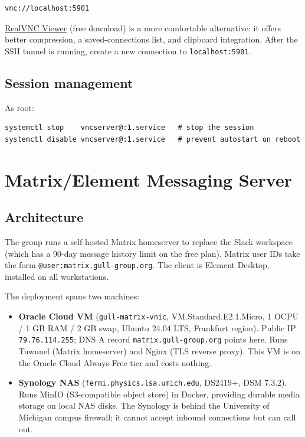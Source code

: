 \documentclass[11pt]{article}
\begin{document}
\begin{verbatim}
vnc://localhost:5901
\end{verbatim}

\href{https://www.realvnc.com/en/connect/download/viewer/}{RealVNC Viewer}
(free download) is a more comfortable alternative: it offers better compression,
a saved-connections list, and clipboard integration.  After the SSH tunnel is
running, create a new connection to \texttt{localhost:5901}.

\subsection*{Session management}

As root:
\begin{verbatim}
systemctl stop    vncserver@:1.service   # stop the session
systemctl disable vncserver@:1.service   # prevent autostart on reboot
\end{verbatim}

\section{Matrix/Element Messaging Server}

\subsection*{Architecture}

The group runs a self-hosted Matrix homeserver to replace the Slack workspace
(which has a 90-day message history limit on the free plan).  Matrix user IDs
take the form \texttt{@user:matrix.gull-group.org}.  The client is Element
Desktop, installed on all workstations.

The deployment spans two machines:

\begin{itemize}
  \item \textbf{Oracle Cloud VM} (\texttt{gull-matrix-vnic}, VM.Standard.E2.1.Micro,
        1 OCPU / 1 GB RAM / 2 GB swap, Ubuntu 24.04 LTS, Frankfurt region).
        Public IP \texttt{79.76.114.255}; DNS A record
        \texttt{matrix.gull-group.org} points here.  Runs Tuwunel (Matrix
        homeserver) and Nginx (TLS reverse proxy).  This VM is on the Oracle
        Cloud Always-Free tier and costs nothing.

  \item \textbf{Synology NAS} (\texttt{fermi.physics.lsa.umich.edu}, DS2419+,
        DSM 7.3.2).  Runs MinIO (S3-compatible object store) in Docker,
        providing durable media storage on local NAS disks.  The Synology is
        behind the University of Michigan campus firewall; it cannot accept
        inbound connections but can call out.
\end{itemize}
\end{document}
